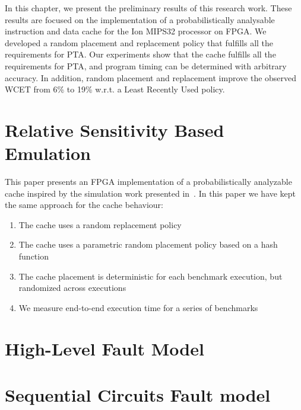\label{sec:preliminary}

In this chapter, we present the preliminary results of this research work. These results are focused on the implementation of a probabilistically analysable instruction and data cache for the Ion MIPS32 processor on
FPGA. We developed a random placement and replacement policy that fulfills
all the requirements for PTA. Our experiments show that the cache fulfills all the requirements for PTA, and program timing can be determined with arbitrary accuracy. In addition, random placement and replacement improve the observed WCET from 6\% to 19\% w.r.t. a Least Recently Used policy.



\section{Relative Sensitivity Based Emulation}

This paper presents an FPGA implementation of a probabilistically analyzable
cache inspired by the simulation work presented
in~\cite{Kosmidis:2013:CDP:2485288.2485416}. In this paper we have
kept the same approach for the cache behaviour:
\begin{enumerate}
\item The cache uses a random replacement policy
\item The cache uses a parametric random placement policy based on
 a hash function
\item The cache placement is deterministic for each benchmark execution, but
  randomized across executions
\item We measure end-to-end execution time for a series of benchmarks
\end{enumerate}

\section{High-Level Fault Model}
\section{Sequential Circuits Fault model}
\label{Hardware Implementation}

\label{Cache Model}

